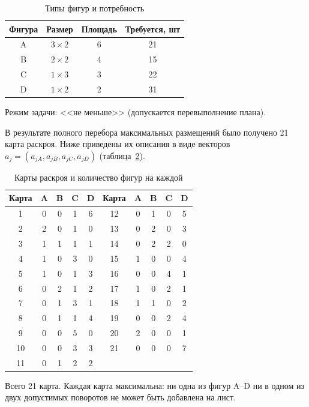 \begin{table}[h!]
\centering
\caption{Типы фигур и потребность}
\label{tab:figures}
\begin{tabular}{|c|c|c|c|}
\hline
Фигура & Размер & Площадь & Требуется, шт \\
\hline
A & $3 \times 2$ & 6 & 21 \\
\hline
B & $2 \times 2$ & 4 & 15 \\
\hline
C & $1 \times 3$ & 3 & 22 \\
\hline
D & $1 \times 2$ & 2 & 31 \\
\hline
\end{tabular}
\end{table}

Режим задачи: <<не меньше>> (допускается перевыполнение плана).


В результате полного перебора максимальных размещений было получено
21 карта раскроя. Ниже приведены их описания в виде векторов
$a_j = (a_{jA}, a_{jB}, a_{jC}, a_{jD})$ (таблица~\ref{tab:cards}).

\begin{table}[h!]
\centering
\caption{Карты раскроя и количество фигур на каждой}
\label{tab:cards}
\small
\begin{tabular}{|c|c|c|c|c||c|c|c|c|c|}
\hline
Карта & A & B & C & D & Карта & A & B & C & D \\
\hline
1  & 0 & 0 & 1 & 6 & 12 & 0 & 1 & 0 & 5 \\
\hline
2  & 2 & 0 & 1 & 0 & 13 & 0 & 2 & 0 & 3 \\
\hline
3  & 1 & 1 & 1 & 1 & 14 & 0 & 2 & 2 & 0 \\
\hline
4  & 1 & 0 & 3 & 0 & 15 & 1 & 0 & 0 & 4 \\
\hline
5  & 1 & 0 & 1 & 3 & 16 & 0 & 0 & 4 & 1 \\
\hline
6  & 0 & 2 & 1 & 2 & 17 & 1 & 0 & 2 & 1 \\
\hline
7  & 0 & 1 & 3 & 1 & 18 & 1 & 1 & 0 & 2 \\
\hline
8  & 0 & 1 & 1 & 4 & 19 & 0 & 0 & 2 & 4 \\
\hline
9  & 0 & 0 & 5 & 0 & 20 & 2 & 0 & 0 & 1 \\
\hline
10 & 0 & 0 & 3 & 3 & 21 & 0 & 0 & 0 & 7 \\
\hline
11 & 0 & 1 & 2 & 2 &    &   &   &   &   \\
\hline
\end{tabular}
\end{table}

Всего 21 карта. Каждая карта максимальна: ни одна из фигур A--D ни в одном
из двух допустимых поворотов не может быть добавлена на лист.


